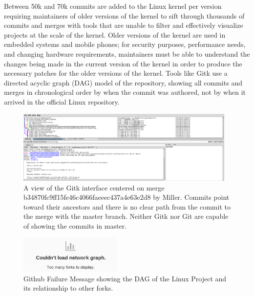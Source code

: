 Between 50k and 70k commits are added to the Linux kernel per version
requiring maintainers of older versions of the kernel to sift through
thousands of commits and merges with tools that are unable to filter and
effectively visualize projects at the scale of the kernel. Older
versions of the kernel are used in embedded systems and mobile phones;
for security purposes, performance needs, and changing hardware
requirements, maintainers must be able to understand the changes being
made in the current version of the kernel in order to produce the
necessary patches for the older versions of the kernel. Tools like Gitk
use a directed acyclic graph (DAG) model of the repository, showing all
commits and merges in chronological order by when the commit was
authored, not by when it arrived in the official Linux repository.

\begin{figure}
        \centering
        \includegraphics[width=0.97\textwidth]{figures/gitk.png}
        \caption{A view of the Gitk interface centered on merge
          b34870fc9ff15fe46c4066faeeec437a4e63e2d8 by Miller. Commits point toward
          their ancestors and there is no clear path from the commit to the merge
          with the master branch. Neither Gitk nor Git are capable of showing the
          commits in master.}
        \label{fig:gitk}
\end{figure}


\begin{figure}
        \centering
        \includegraphics[width=0.45\textwidth]{figures/github_viewer.png}
        \caption{Github Failure Message showing the DAG of the Linux Project and its
                relationship to other forks.}
        \label{fig:gitfail}
\end{figure}


